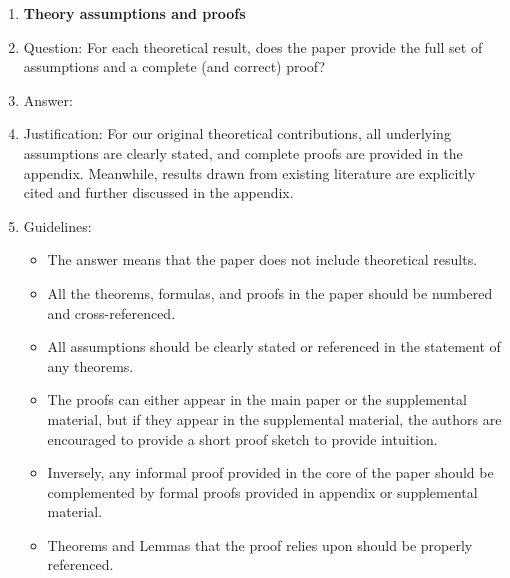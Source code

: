 \documentclass{article}
\begin{document}
\begin{enumerate}
\item {\bf Theory assumptions and proofs}
    \item[] Question: For each theoretical result, does the paper provide the full set of assumptions and a complete (and correct) proof?
    \item[] Answer: \answerYes{} %
    \item[] Justification: For our original theoretical contributions, all underlying assumptions are clearly stated, and complete proofs are provided in the appendix. Meanwhile, results drawn from existing literature are explicitly cited and further discussed in the appendix. 
    \item[] Guidelines:
    \begin{itemize}
        \item The answer \answerNA{} means that the paper does not include theoretical results. 
        \item All the theorems, formulas, and proofs in the paper should be numbered and cross-referenced.
        \item All assumptions should be clearly stated or referenced in the statement of any theorems.
        \item The proofs can either appear in the main paper or the supplemental material, but if they appear in the supplemental material, the authors are encouraged to provide a short proof sketch to provide intuition. 
        \item Inversely, any informal proof provided in the core of the paper should be complemented by formal proofs provided in appendix or supplemental material.
        \item Theorems and Lemmas that the proof relies upon should be properly referenced. 
    \end{itemize}


\end{enumerate}
\end{document}

